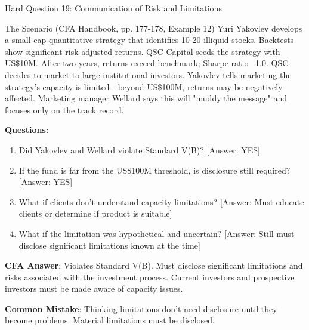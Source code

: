 \documentclass{beamer}
\begin{document}
	\begin{frame}{Hard Question 19: Communication of Risk and Limitations}
		\begin{block}{The Scenario (CFA Handbook, pp. 177-178, Example 12)}
			Yuri Yakovlev develops a small-cap quantitative strategy that identifies 10-20 illiquid stocks. Backtests show significant risk-adjusted returns. QSC Capital seeds the strategy with US\$10M. After two years, returns exceed benchmark; Sharpe ratio ~1.0. QSC decides to market to large institutional investors. Yakovlev tells marketing the strategy's capacity is limited - beyond US\$100M, returns may be negatively affected. Marketing manager Wellard says this will "muddy the message" and focuses only on the track record.
		\end{block}
		
		\vspace{0.2cm}
		\textbf{Questions:}
		\begin{enumerate}
			\item Did Yakovlev and Wellard violate Standard V(B)? \textcolor{cfared}{[Answer: YES]}
			\item If the fund is far from the US\$100M threshold, is disclosure still required? \textcolor{cfared}{[Answer: YES]}
			\item What if clients don't understand capacity limitations? \textcolor{cfared}{[Answer: Must educate clients or determine if product is suitable]}
			\item What if the limitation was hypothetical and uncertain? \textcolor{cfared}{[Answer: Still must disclose significant limitations known at the time]}
		\end{enumerate}
		
		\vspace{0.2cm}
		\textcolor{cfablue}{\textbf{CFA Answer}}: Violates Standard V(B). Must disclose significant limitations and risks associated with the investment process. Current investors and prospective investors must be made aware of capacity issues.
		
		\vspace{0.1cm}
		\textcolor{cfared}{\textbf{Common Mistake}}: Thinking limitations don't need disclosure until they become problems. Material limitations must be disclosed.
	\end{frame}
	
\end{document}
